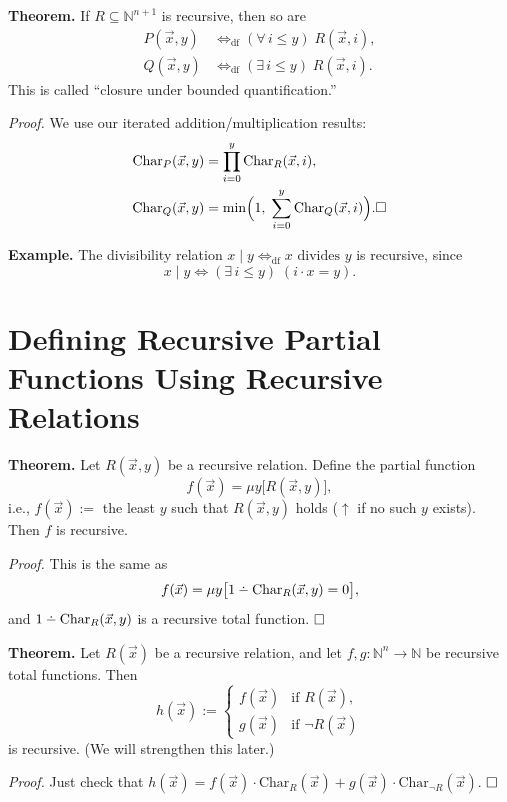 \documentclass[11pt]{article}
\newcommand{\dotminus}{\mathbin{\ooalign{\hidewidth\raise0.5ex\hbox{$\cdot$}\hidewidth\cr$-$\cr}}}
\begin{document}
\textbf{Theorem.} If $R \subseteq \mathbb{N}^{n+1}$ is recursive, then so are
\begin{align*}
    P(\vec{x}, y) &\iff_{\mathrm{df}} (\forall\, i \le y)\; R(\vec{x}, i), \\
    Q(\vec{x}, y) &\iff_{\mathrm{df}} (\exists\, i \le y)\; R(\vec{x}, i).
\end{align*}
This is called ``closure under bounded quantification.''

\textit{Proof.} We use our iterated addition/multiplication results:
\begin{align*}
    \mathrm{Char}_P(\vec{x}, y) &= \prod_{i=0}^{y} \mathrm{Char}_R(\vec{x}, i), \\
    \mathrm{Char}_Q(\vec{x}, y) &= \min\Bigl(1,\; \sum_{i=0}^{y} \mathrm{Char}_Q(\vec{x}, i)\Bigr). \hfill\square
\end{align*}

\textbf{Example.} The divisibility relation $x \mid y \iff_{\mathrm{df}} x \text{ divides } y$ is recursive, since
\[
    x \mid y \iff (\exists\, i \le y)\;(i \cdot x = y).
\]

\section{Defining Recursive Partial Functions Using Recursive Relations}

\textbf{Theorem.} Let $R(\vec{x}, y)$ be a recursive relation. Define the partial function
\[
    f(\vec{x}) = \mu y\bigl[R(\vec{x}, y)\bigr],
\]
i.e., $f(\vec{x}) :=$ the least $y$ such that $R(\vec{x}, y)$ holds (${\uparrow}$ if no such $y$ exists). Then $f$ is recursive.

\textit{Proof.} This is the same as
\[
    f(\vec{x}) = \mu y\bigl[1 \dotminus \mathrm{Char}_R(\vec{x}, y) = 0\bigr],
\]
and $1 \dotminus \mathrm{Char}_R(\vec{x}, y)$ is a recursive total function. $\hfill\square$

\textbf{Theorem.} Let $R(\vec{x})$ be a recursive relation, and let $f, g\colon \mathbb{N}^n \to \mathbb{N}$ be recursive total functions. Then
\[
    h(\vec{x}) := \begin{cases} f(\vec{x}) & \text{if } R(\vec{x}), \\ g(\vec{x}) & \text{if } \neg R(\vec{x}) \end{cases}
\]
is recursive. (We will strengthen this later.)

\textit{Proof.} Just check that $h(\vec{x}) = f(\vec{x}) \cdot \mathrm{Char}_R(\vec{x}) + g(\vec{x}) \cdot \mathrm{Char}_{\neg R}(\vec{x})$. $\hfill\square$
\end{document}
